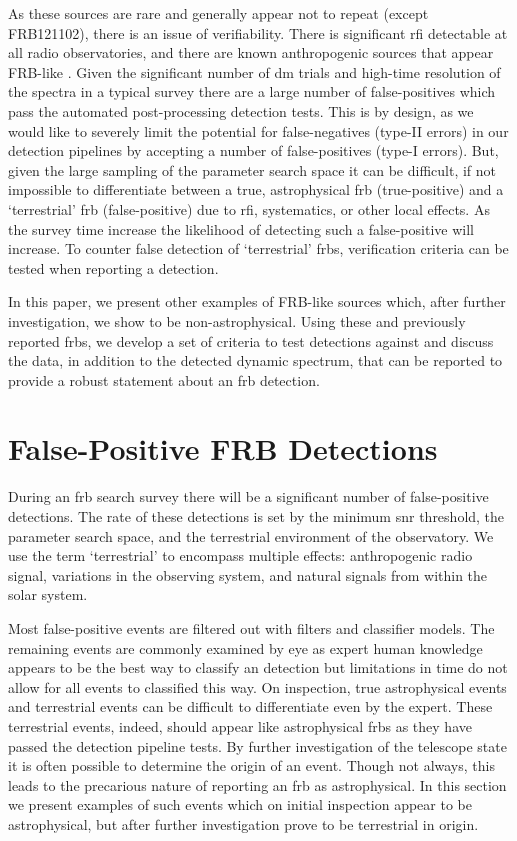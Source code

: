 \documentclass[a4paper,fleqn,usenatbib]{mnras}
\begin{document}
As these sources are rare and generally appear not to repeat (except FRB121102),
there is an issue of verifiability. There is significant \gls{rfi} detectable at
all radio observatories, and there are known anthropogenic sources that appear
FRB-like \citep{2011ApJ...727...18B}.  Given the significant number of \gls{dm}
trials and high-time resolution of the spectra in a typical survey there are a
large number of false-positives which pass the automated post-processing
detection tests.  This is by design, as we would like to severely limit the
potential for false-negatives (type-II errors) in our detection pipelines by
accepting a number of false-positives (type-I errors).  But, given the large
sampling of the parameter search space it can be difficult, if not impossible to
differentiate between a true, astrophysical \gls{frb} (true-positive) and a
`terrestrial' \gls{frb} (false-positive) due to \gls{rfi}, systematics, or other
local effects. As the survey time increase the likelihood of detecting such a
false-positive will increase. To counter false detection of `terrestrial'
\glspl{frb}, verification criteria can be tested when reporting a detection.

In this paper, we present other examples of FRB-like sources which, after
further investigation, we show to be non-astrophysical. Using these and
previously reported \glspl{frb}, we develop a set of criteria to test detections
against and discuss the data, in addition to the detected dynamic spectrum, that
can be reported to provide a robust statement about an \gls{frb} detection.

\section{False-Positive FRB Detections}
\label{sec:false-pos}

During an \gls{frb} search survey there will be a significant number of
false-positive detections. The rate of these detections is set by the minimum
\gls{snr} threshold, the parameter search space, and the terrestrial environment
of the observatory. We use the term `terrestrial' to encompass multiple effects:
anthropogenic radio signal, variations in the observing system, and natural
signals from within the solar system.

Most false-positive events are filtered out with filters and classifier models.
The remaining events are commonly examined by eye as expert human knowledge
appears to be the best way to classify an detection but limitations in time do
not allow for all events to classified this way. On inspection, true
astrophysical events and terrestrial events can be difficult to differentiate
even by the expert.  These terrestrial events, indeed, should appear like
astrophysical \glspl{frb} as they have passed the detection pipeline tests. By
further investigation of the telescope state it is often possible to determine
the origin of an event. Though not always, this leads to the precarious nature
of reporting an \gls{frb} as astrophysical.  In this section we present examples
of such events which on initial inspection appear to be astrophysical, but after
further investigation prove to be terrestrial in origin.
\end{document}
